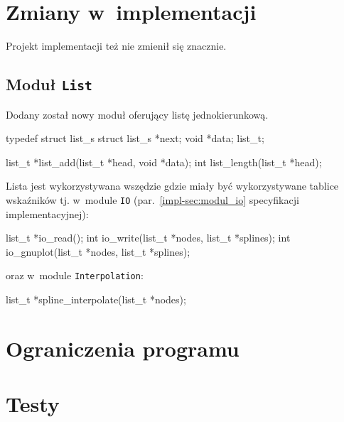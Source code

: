 \documentclass[10pt,a4paper]{article}
\begin{document}
\section{Zmiany w~implementacji}
Projekt implementacji też nie zmienił się znacznie.

\subsection{Moduł {\tt List}}
Dodany został nowy moduł oferujący listę jednokierunkową.
\begin{SmallVerbatim}
    typedef struct list_s {
      struct list_s *next;
      void *data;
    } list_t;

    list_t *list_add(list_t *head, void *data);
    int list_length(list_t *head);
\end{SmallVerbatim}

Lista jest wykorzystywana wszędzie gdzie miały być wykorzystywane tablice
wskaźników tj. w~module \texttt{IO} (par.~\ref{impl-sec:modul_io} specyfikacji
implementacyjnej):
\begin{SmallVerbatim}
    list_t *io_read();
    int io_write(list_t *nodes, list_t *splines);
    int io_gnuplot(list_t *nodes, list_t *splines);
\end{SmallVerbatim}
oraz w~module \texttt{Interpolation}:
\begin{SmallVerbatim}
    list_t *spline_interpolate(list_t *nodes);
\end{SmallVerbatim}

\section{Ograniczenia programu}

\section{Testy}
\end{document}

